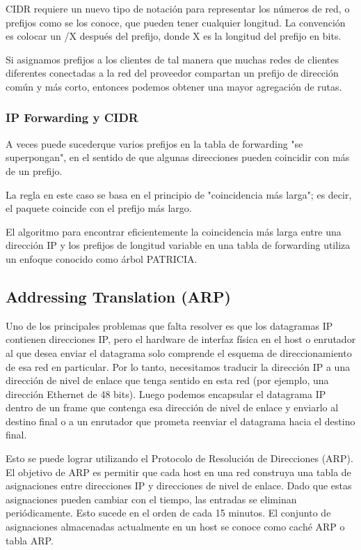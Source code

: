 CIDR requiere un nuevo tipo de notación para representar los números de red, o prefijos como se los conoce, que pueden tener cualquier longitud. La convención es colocar un /X después del prefijo, donde X es la longitud del prefijo en bits.

Si asignamos prefijos a los clientes de tal manera que muchas redes de clientes diferentes conectadas a la red del proveedor compartan un prefijo de dirección común y más corto, entonces podemos obtener una mayor agregación de rutas.

\subsubsection*{IP Forwarding y CIDR}
A veces puede sucederque varios prefijos en la tabla de forwarding "se superpongan", en el sentido de que algunas direcciones pueden coincidir con más de un prefijo.

La regla en este caso se basa en el principio de "coincidencia más larga"; es decir, el paquete coincide con el prefijo más largo.

El algoritmo para encontrar eficientemente la coincidencia más larga entre una dirección IP y los prefijos de longitud variable en una tabla de forwarding utiliza un enfoque conocido como árbol PATRICIA.

\subsection{Addressing Translation (ARP)}
Uno de los principales problemas que falta resolver es que los datagramas IP contienen direcciones IP, pero el hardware de interfaz física en el host o enrutador al que desea enviar el datagrama solo comprende el esquema de direccionamiento de esa red en particular. Por lo tanto, necesitamos traducir la dirección IP a una dirección de nivel de enlace que tenga sentido en esta red (por ejemplo, una dirección Ethernet de 48 bits). Luego podemos encapsular el datagrama IP dentro de un frame que contenga esa dirección de nivel de enlace y enviarlo al destino final o a un enrutador que prometa reenviar el datagrama hacia el destino final.

Esto se puede lograr utilizando el Protocolo de Resolución de Direcciones (ARP). El objetivo de ARP es permitir que cada host en una red construya una tabla de asignaciones entre direcciones IP y direcciones de nivel de enlace. Dado que estas asignaciones pueden cambiar con el tiempo, las entradas se eliminan periódicamente. Esto sucede en el orden de cada 15 minutos. El conjunto de asignaciones almacenadas actualmente en un host se conoce como caché ARP o tabla ARP.



